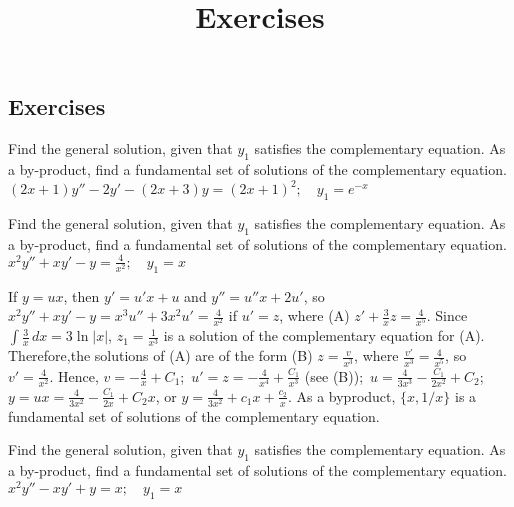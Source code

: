 \documentclass{ximera}
\title{Exercises} \license{CC BY-NC-SA 4.0}
\begin{document}
\begin{abstract}
\end{abstract}
\maketitle

\begin{onlineOnly}
\section*{Exercises}
\end{onlineOnly}


\begin{problem}\label{exer:5.6.1}
Find the general solution,
given that $y_1$ satisfies the complementary equation. As a by-product,
find a fundamental set of solutions of the complementary equation. $(2x+1)y''-2y'-(2x+3)y=(2x+1)^2;  \quad y_1=e^{-x}$
\end{problem}

\begin{problem}\label{exer:5.6.2}
Find the general solution,
given that $y_1$ satisfies the complementary equation. As a by-product,
find a fundamental set of solutions of the complementary equation. $x^2y''+xy'-y=\frac{4}{x^2};   \quad y_1=x$

\begin{solution}
    If $y=ux$, then $y'=u'x+u$ and $y''=u''x+2u'$, so
$x^2y''+xy'-y=x^3u''+3x^2u'=\frac{4}{ x^2}$ if $u'=z$, where (A)
$z'+\frac{3}{ x}z=\frac{4}{ x^5}$. Since $\int\frac{3}{
x}\,dx=3\ln|x|$, $z_1=\frac{1}{ x^3}$ is a solution of the
complementary equation for (A). Therefore,the solutions of (A) are of
the form (B) $z=\frac{v}{ x^3}$, where $\frac{v'}{
x^3}=\frac{4}{ x^5}$, so $v'=\frac{4}{ x^2}$. Hence,
$v=-\frac{4}{ x}+C_1$;\ $u'=z=-\frac{4}{ x^4}+\frac{C_1}{ x^3}$
(see (B));\ $u=\frac{4}{ 3x^3}-\frac{C_1}{2x^2}+C_2$;\;
$y=ux=\frac{4}{ 3x^2}-\frac{C_1}{2x}+C_2x$, or $y=\frac{4}{
3x^2}+c_1x+\frac{c_2}{ x}$. As a byproduct, $\{x,1/x\}$ is a
fundamental set of solutions of the complementary equation.
\end{solution}
\end{problem}

\begin{problem}\label{exer:5.6.3}
Find the general solution,
given that $y_1$ satisfies the complementary equation. As a by-product,
find a fundamental set of solutions of the complementary equation. $x^2y''-xy'+y=x;   \quad y_1=x$
\end{problem}
\end{document}
